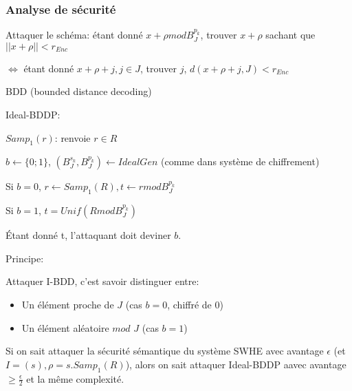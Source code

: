 \subsubsection{Analyse de sécurité}

Attaquer le schéma: étant donné $x + \rho mod B_J^{p_k}$, trouver $x+\rho$ sachant que $||x+\rho|| < r_{Enc}$

$\Leftrightarrow$ étant donné $x+\rho+j, j \in J$, trouver $j$, $d(x+\rho+j,J)< r_{Enc}$

BDD (bounded distance decoding)

Ideal-BDDP:

$Samp_1(r)$: renvoie $r \in R$

$b \leftarrow \{0;1 \}$, $(B_J^{s_k},B_J^{p_k}) \leftarrow IdealGen$ (comme dans système de chiffrement)

Si $b=0$, $r \leftarrow Samp_1(R), t \leftarrow r mod B_J^{p_k}$

Si $b=1$, $t=Unif (R mod B_J^{p_k})$

Étant donné t, l'attaquant doit deviner $b$.

Principe: 

Attaquer I-BDD, c'est savoir distinguer entre:
\begin{itemize}
\item Un élément proche de $J$ (cas $b=0$, chiffré de $0$)
\item Un élément aléatoire $mod$ $J$ (cas $b=1$)
\end{itemize}

\begin{theorem}
Si on sait attaquer la sécurité sémantique du système SWHE avec avantage $\epsilon$ (et $I=(s), \rho=s. Samp_1(R)$), alors on sait attaquer Ideal-BDDP aavec avantage $\geq \frac{ \epsilon}{2}$ et la même complexité.
\end{theorem}

